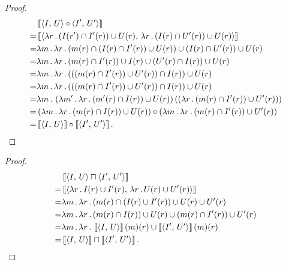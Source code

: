 \equalComp*
{}
\begin{proof}
\begin{align*}
  &\left\llbracket\left\langle I,\,U\right\rangle\circ\left\langle I',\,U'\right\rangle\right\rrbracket\\
  =&\left\llbracket\left\langle \lambda r\,.\,(I(r')\cap I'(r))\cup U(r),\,\lambda r\,.\,(I(r)\cap U'(r))\cup U(r)\right\rangle\right\rrbracket\\
  =&\lambda m\,.\,\lambda r\,.\,(m(r)\cap(I(r)\cap I'(r))\cup U(r))\cup(I(r)\cap U'(r))\cup U(r)\\
  =&\lambda m\,.\,\lambda r\,.\,(m(r)\cap I'(r))\cup I(r)\cup (U'(r)\cap I(r))\cup U(r)\\
  =&\lambda m\,.\,\lambda r\,.\,(((m(r)\cap I'(r))\cup U'(r))\cap I(r))\cup U(r)\\
  =&\lambda m\,.\,\lambda r\,.\,(((m(r)\cap I'(r))\cup U'(r))\cap I(r))\cup U(r)\\
  =&\lambda m\,.\,\left(\lambda m'\,.\,\lambda r\,.\,(m'(r)\cap I(r))\cup U(r)\right)
    \left(
    \left(\lambda r\,.\,(m(r)\cap I'(r))\cup U'(r)\right)
    \right)\\
  =&\left(\lambda m\,.\,\lambda r\,.\,(m(r)\cap I(r))\cup U(r)\right)\circ
    \left(\lambda m\,.\,\lambda r\,.\,(m(r)\cap I'(r))\cup U'(r)\right)\\
  =&\left\llbracket\left\langle I,\,U\right\rangle\right\rrbracket\circ\left\llbracket\left\langle I',\,U'\right\rangle\right\rrbracket.\qedhere
\end{align*}
\end{proof}

\equalMeet*
\begin{proof}
\begin{align*}
  &\left\llbracket\left\langle I,\,U\right\rangle \sqcap \left\langle I',\,U'\right\rangle\right\rrbracket\\
  =&\left\llbracket\left\langle \lambda r\,.\,I(r) \cup I'(r),\,\lambda r\,.\,U(r) \cup U'(r)\right\rangle\right\rrbracket\\
  =&\lambda m\,.\,\lambda r\,.\,(m(r)\cap(I(r)\cup I'(r))\cup U(r)\cup U'(r)\\
  =&\lambda m\,.\,\lambda r\,.\,(m(r)\cap I(r))\cup U(r)\cup(m(r)\cap I'(r))\cup U'(r)\\
  =&\lambda m\,.\,\lambda r\,.\,\left\llbracket\left\langle I,\,U\right\rangle\right\rrbracket(m)(r)\cup\left\llbracket\left\langle I',\,U'\right\rangle\right\rrbracket(m)(r)\\
  =&\left\llbracket\left\langle I,\,U\right\rangle\right\rrbracket \sqcap \left\llbracket\left\langle I',\,U'\right\rangle\right\rrbracket.\qedhere
\end{align*}
\end{proof}

